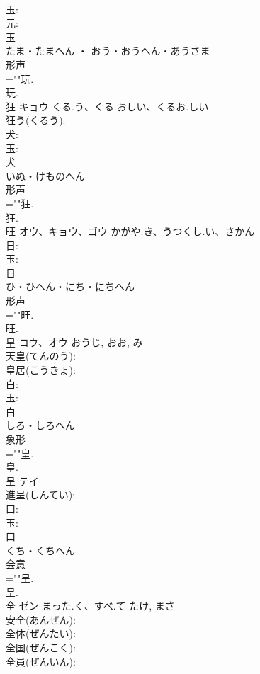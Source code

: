 \documentclass[8pt]{extreport}
\begin{document}
\begin{CJK}{UTF8}{min}
\\	玉: 
\\	元: 
\\	玉	
\\	たま・たまへん ・ おう・おうへん・あうさま	
\\	形声 
\\	=""玩.
\\	玩.
\\	狂	キョウ	くる.う、くる.おしい、くるお.しい		
\\	狂う(くるう): 
\\	犬: 
\\	玉: 
\\	犬	
\\	いぬ・けものへん	
\\	形声 
\\	=""狂.
\\	狂.
\\	旺	オウ、キョウ、ゴウ	かがや.き、うつくし.い、さかん		
\\	日: 
\\	玉: 
\\	日	
\\	ひ・ひへん・にち・にちへん	
\\	形声 
\\	=""旺.
\\	旺.
\\	皇	コウ、オウ		おうじ, おお, み	
\\	天皇(てんのう): 
\\	皇居(こうきょ): 
\\	白: 
\\	玉: 
\\	白	
\\	しろ・しろへん	
\\	象形 
\\	=""皇.
\\	皇.
\\	呈	テイ			
\\	進呈(しんてい): 
\\	口: 
\\	玉: 
\\	口	
\\	くち・くちへん	
\\	会意 
\\	=""呈.
\\	呈.
\\	全	ゼン	まった.く、すべ.て	たけ, まさ	
\\	安全(あんぜん): 
\\	全体(ぜんたい): 
\\	全国(ぜんこく): 
\\	全員(ぜんいん): 

\end{CJK}
\end{document}
